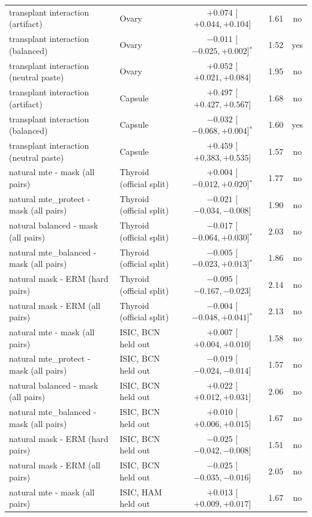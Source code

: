 \begin{center}
{\begin{tabular}{llccc}
transplant interaction (artifact) & Ovary & $+0.074$ [$+0.044, +0.104$] & 1.61 & no \\
transplant interaction (balanced) & Ovary & $-0.011$ [$-0.025, +0.002$]$^*$ & 1.52 & yes \\
transplant interaction (neutral paste) & Ovary & $+0.052$ [$+0.021, +0.084$] & 1.95 & no \\
transplant interaction (artifact) & Capsule & $+0.497$ [$+0.427, +0.567$] & 1.68 & no \\
transplant interaction (balanced) & Capsule & $-0.032$ [$-0.068, +0.004$]$^*$ & 1.60 & yes \\
transplant interaction (neutral paste) & Capsule & $+0.459$ [$+0.383, +0.535$] & 1.57 & no \\
natural mte - mask (all pairs) & Thyroid (official split) & $+0.004$ [$-0.012, +0.020$]$^*$ & 1.77 & no \\
natural mte\_protect - mask (all pairs) & Thyroid (official split) & $-0.021$ [$-0.034, -0.008$] & 1.90 & no \\
natural balanced - mask (all pairs) & Thyroid (official split) & $-0.017$ [$-0.064, +0.030$]$^*$ & 2.03 & no \\
natural mte\_balanced - mask (all pairs) & Thyroid (official split) & $-0.005$ [$-0.023, +0.013$]$^*$ & 1.86 & no \\
natural mask - ERM (hard pairs) & Thyroid (official split) & $-0.095$ [$-0.167, -0.023$] & 2.14 & no \\
natural mask - ERM (all pairs) & Thyroid (official split) & $-0.004$ [$-0.048, +0.041$]$^*$ & 2.13 & no \\
natural mte - mask (all pairs) & ISIC, BCN held out & $+0.007$ [$+0.004, +0.010$] & 1.58 & no \\
natural mte\_protect - mask (all pairs) & ISIC, BCN held out & $-0.019$ [$-0.024, -0.014$] & 1.57 & no \\
natural balanced - mask (all pairs) & ISIC, BCN held out & $+0.022$ [$+0.012, +0.031$] & 2.06 & no \\
natural mte\_balanced - mask (all pairs) & ISIC, BCN held out & $+0.010$ [$+0.006, +0.015$] & 1.67 & no \\
natural mask - ERM (hard pairs) & ISIC, BCN held out & $-0.025$ [$-0.042, -0.008$] & 1.51 & no \\
natural mask - ERM (all pairs) & ISIC, BCN held out & $-0.025$ [$-0.035, -0.016$] & 2.05 & no \\
natural mte - mask (all pairs) & ISIC, HAM held out & $+0.013$ [$+0.009, +0.017$] & 1.67 & no \\

\end{tabular}}
\end{center}
